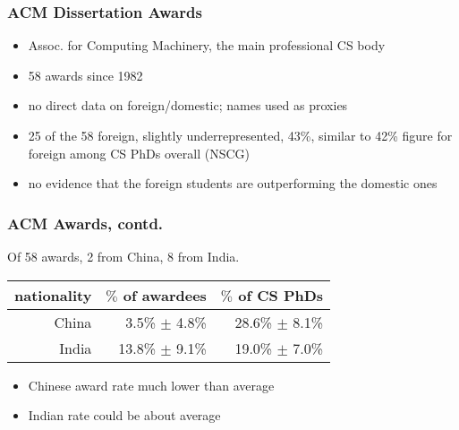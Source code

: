\documentclass{beamer}
\begin{document}
\begin{frame}
\frametitle{ACM Dissertation Awards}

\pause

\begin{itemize}

\item Assoc. for Computing Machinery, the main professional CS body
\pause

\item 58 awards since 1982
\pause

\item no direct data on foreign/domestic; names used as proxies
\pause

\item 25 of the 58 foreign, slightly underrepresented, 43\%, similar to
42\% figure for foreign among CS PhDs overall (NSCG)
\pause

\item no evidence that the foreign students are outperforming the
domestic ones

\end{itemize}

\end{frame}

\begin{frame}
\frametitle{ACM Awards, contd.}
\pause

Of 58 awards, 2 from China, 8 from India.
\pause

\medskip

\begin{tabular}{|r|r|r|}
\hline
nationality & $\%$ of awardees & $\%$ of CS PhDs \\ \hline
\hline
China & 3.5\% $\pm$ 4.8\% & 28.6\% $\pm$ 8.1\% \\ \hline
India & 13.8\% $\pm$ 9.1\% & 19.0\% $\pm$ 7.0\% \\ \hline
\end{tabular}

\pause

\medskip

\begin{itemize}

\item Chinese award rate much lower than average
\pause

\item Indian rate could be about average

\end{itemize}

\end{frame}
\end{document}

